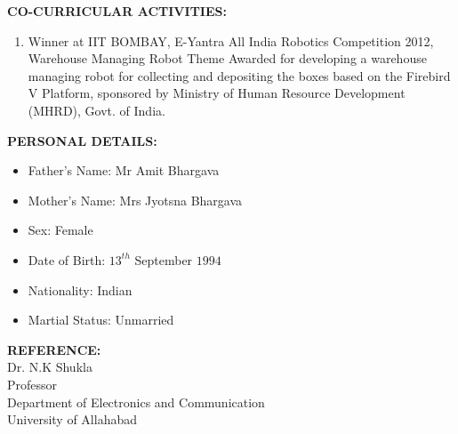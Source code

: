 \documentclass{article}
\begin{document}
\textbf{CO-CURRICULAR ACTIVITIES:}
\begin{enumerate}
	\item Winner at IIT BOMBAY, E-Yantra All India Robotics Competition 2012, Warehouse Managing Robot Theme
	Awarded for developing a warehouse managing robot for collecting and depositing the boxes based on the Firebird V Platform, sponsored by Ministry of Human Resource Development (MHRD), Govt. of India.
\end{enumerate}

\textbf{PERSONAL DETAILS:}
\begin{itemize}
	\item Father's Name: Mr Amit Bhargava
	\item Mother's Name: Mrs Jyotsna Bhargava
	\item Sex: Female
	\item Date of Birth: $13^{th}$ September $1994$
	\item Nationality: Indian
	\item Martial Status: Unmarried
\end{itemize}

\textbf{REFERENCE:}\\
Dr. N.K Shukla\\
Professor\\
Department of Electronics and Communication\\
University of Allahabad\\
\end{document}

